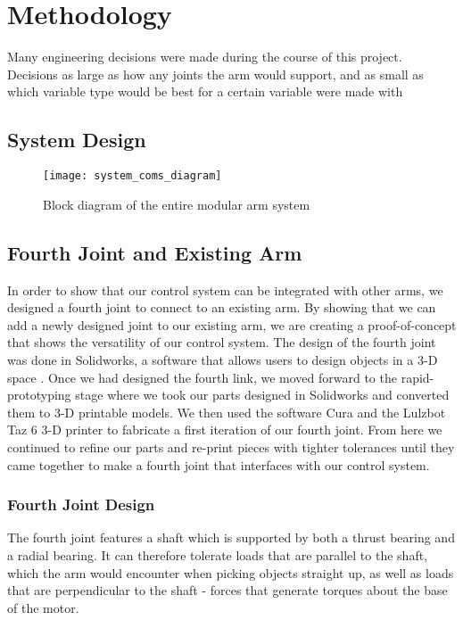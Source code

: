 \section{Methodology}
Many engineering decisions were made during the course of this project. Decisions as large as how any joints the arm would support, and as small as which variable type would be best for a certain variable were made with 

\subsection{System Design}
\begin{figure}[H]
	\centering
	\texttt{[image: system\_coms\_diagram]}
	\caption{Block diagram of the entire modular arm system}
	\label{fig:system_block_diagram}
\end{figure}


\subsection{Fourth Joint and Existing Arm}
In order to show that our control system can be integrated with other arms, we designed a fourth joint to connect to an existing arm. By showing that we can add a newly designed joint to our existing arm, we are creating a proof-of-concept that shows the versatility of our control system.  The design of the fourth joint was done in Solidworks, a software that allows users to design objects in a 3-D space \cite{Solidworks}. Once we had designed the fourth link, we moved forward to the rapid-prototyping stage where we took our parts designed in Solidworks and converted them to 3-D printable models.  We then used the software Cura \cite{Cura} and the Lulzbot Taz 6 3-D printer \cite{Taz6} to fabricate a first iteration of our fourth joint.  From here we continued to refine our parts and re-print pieces with tighter tolerances until they came together to make a fourth joint that interfaces with our control system.

\subsubsection{Fourth Joint Design}

The fourth joint features a shaft which is supported by both a thrust bearing and a radial bearing. It can therefore tolerate loads that are parallel to the shaft, which the arm would encounter when picking objects straight up, as well as loads that are perpendicular to the shaft - forces that generate torques about the base of the motor.\\


